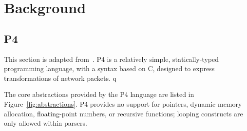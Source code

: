 \section{Background}\label{sec:bacground}

\subsection{P4}

This section is adapted from~\cite{budiu-osr17}.
P4 is a relatively simple, statically-typed programming language, with
a syntax based on C, designed to express transformations of network
packets.  q

The core abstractions provided by the P4 language are listed in
Figure~\ref{fig:abstractions}.  P4 provides no support for pointers,
dynamic memory allocation, floating-point numbers, or recursive
functions; looping constructs are only allowed within parsers.

